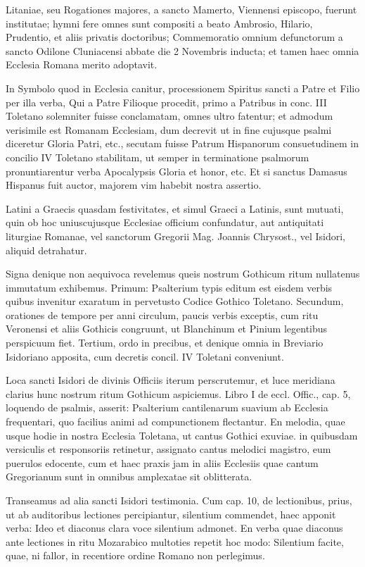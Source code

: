 \documentclass[letter,11pt]{book}
\begin{document}
Litaniae, seu Rogationes majores, a sancto Mamerto, Viennensi episcopo, fuerunt institutae; hymni fere omnes sunt compositi a beato Ambrosio, Hilario, Prudentio, et aliis privatis doctoribus; Commemoratio omnium defunctorum a sancto Odilone Cluniacensi abbate die 2 Novembris inducta; et tamen haec omnia Ecclesia Romana merito adoptavit.

In Symbolo quod in Ecclesia canitur, processionem Spiritus sancti a Patre et Filio per illa verba, Qui a Patre Filioque procedit, primo a Patribus in conc. III Toletano solemniter fuisse conclamatam, omnes ultro fatentur; et admodum verisimile est Romanam Ecclesiam, dum decrevit ut in fine cujusque psalmi diceretur Gloria Patri, etc., secutam fuisse Patrum Hispanorum consuetudinem in concilio IV Toletano stabilitam, ut semper in terminatione psalmorum pronuntiarentur verba Apocalypsis Gloria et honor, etc. Et si sanctus Damasus Hispanus fuit auctor, majorem vim habebit nostra assertio.

Latini a Graecis quasdam festivitates, et simul Graeci a Latinis, sunt mutuati, quin ob hoc uniuscujusque Ecclesiae officium confundatur, aut antiquitati liturgiae Romanae, vel sanctorum Gregorii Mag. Joannis Chrysost., vel Isidori, aliquid detrahatur.

Signa denique non aequivoca revelemus queis nostrum Gothicum ritum nullatenus immutatum exhibemus. Primum: Psalterium typis editum est eisdem verbis quibus invenitur exaratum in pervetusto Codice Gothico Toletano. Secundum, orationes de tempore per anni circulum, paucis verbis exceptis, cum ritu Veronensi et aliis Gothicis congruunt, ut Blanchinum et Pinium legentibus perspicuum fiet. Tertium, ordo in precibus, et denique omnia in Breviario Isidoriano apposita, cum decretis concil. IV Toletani conveniunt.

Loca sancti Isidori de divinis Officiis iterum perscrutemur, et luce meridiana clarius hunc nostrum ritum Gothicum aspiciemus. Libro I de eccl. Offic., cap. 5, loquendo de psalmis, asserit: Psalterium cantilenarum suavium ab Ecclesia frequentari, quo facilius animi ad compunctionem flectantur. En melodia, quae usque hodie in nostra Ecclesia Toletana, ut cantus Gothici exuviae. in quibusdam versiculis et responsoriis retinetur, assignato cantus melodici magistro, eum puerulos edocente, cum et haec praxis jam in aliis Ecclesiis quae cantum Gregorianum sunt in omnibus amplexatae sit oblitterata.

Transeamus ad alia sancti Isidori testimonia. Cum cap. 10, de lectionibus, prius, ut ab auditoribus lectiones percipiantur, silentium commendet, haec apponit verba: Ideo et diaconus clara voce silentium admonet. En verba quae diaconus ante lectiones in ritu Mozarabico multoties repetit hoc modo: Silentium facite, quae, ni fallor, in recentiore ordine Romano non perlegimus.
\end{document}
